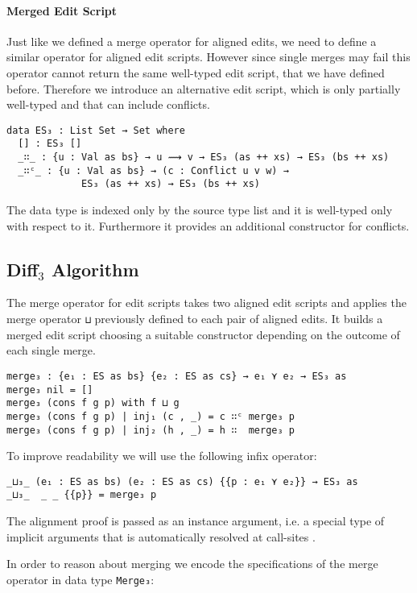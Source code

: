 \documentclass[preprint]{sigplanconf}
\theoremstyle{plain}
\begin{document}
	\paragraph{Merged Edit Script}
	Just like we defined a merge operator for aligned edits, we need to 
	define a similar operator for aligned edit scripts.
	However since single merges may fail this operator cannot return 
	the same well-typed edit script, that we have defined before.
	Therefore we introduce an alternative edit script, which is only partially 
	well-typed and that can include conflicts.
\begin{verbatim}
data ES₃ : List Set → Set where
  [] : ES₃ []
  _∷_ : {u : Val as bs} → u ⟿ v → ES₃ (as ++ xs) → ES₃ (bs ++ xs)
  _∷ᶜ_ : {u : Val as bs} → (c : Conflict u v w) → 
             ES₃ (as ++ xs) → ES₃ (bs ++ xs)
\end{verbatim}
	The data type is indexed only by the source type list and it is well-typed
	only with respect to it. Furthermore it provides an additional constructor
	for conflicts. 

        \subsection{Diff$_3$ Algorithm}
        \label{subsec:diff3-algo}

	The merge operator for edit scripts takes two aligned edit scripts and
	applies the merge operator \texttt{⊔} previously defined to
	each pair of aligned edits. It builds a merged edit script choosing a 
	suitable constructor depending on the outcome of each single merge.

\begin{verbatim}
merge₃ : {e₁ : ES as bs} {e₂ : ES as cs} → e₁ ⋎ e₂ → ES₃ as
merge₃ nil = []
merge₃ (cons f g p) with f ⊔ g
merge₃ (cons f g p) | inj₁ (c , _) = c ∷ᶜ merge₃ p
merge₃ (cons f g p) | inj₂ (h , _) = h ∷  merge₃ p
\end{verbatim}
	To improve readability we will use the following infix
        operator:
\begin{verbatim}
_⊔₃_ (e₁ : ES as bs) (e₂ : ES as cs) {{p : e₁ ⋎ e₂}} → ES₃ as
_⊔₃_  _ _ {{p}} = merge₃ p
\end{verbatim}
	The alignment proof is passed  as an instance argument, i.e. a
        special  type  of  implicit arguments  that  is  automatically
        resolved at call-sites \cite{Devriese11}.

        In order to reason about merging we encode the specifications
        of the merge operator in data type \texttt{Merge₃}:
\end{document}
